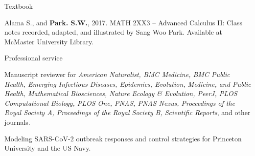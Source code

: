 \documentclass[
	11pt, %
]{resume} %
\begin{document}
\begin{rSection}{Textbook}

Alama S., and \textbf{Park. S.W.}, 2017. MATH 2XX3 -- Advanced Calculus II: Class notes recorded, adapted, and illustrated by Sang Woo Park. Available at McMaster University Library.

\end{rSection}

\begin{rSection}{Professional service}

Manuscript reviewer for \textit{American Naturalist, BMC Medicine, BMC Public Health, Emerging Infectious Diseases, Epidemics, Evolution, Medicine, and Public Health, Mathematical Biosciences, Nature Ecology \& Evolution, PeerJ, PLOS Computational Biology, PLOS One, PNAS, PNAS Nexus, Proceedings of the Royal Society A, Proceedings of the Royal Society B, Scientific Reports}, and other journals.

Modeling SARS-CoV-2 outbreak responses and control strategies for Princeton University and the US Navy. 

\end{rSection}
\end{document}
